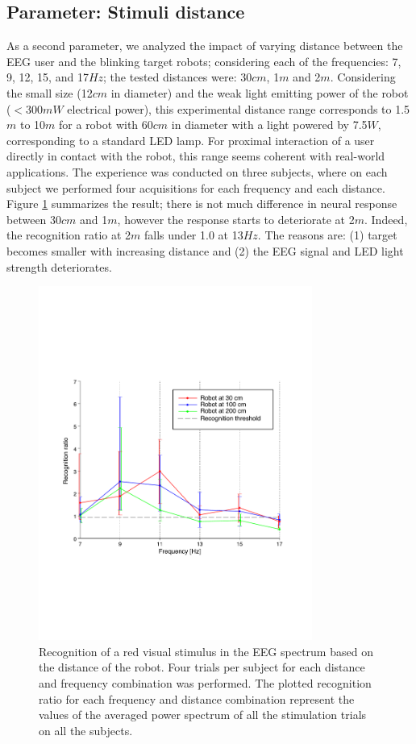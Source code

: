 \documentclass[smallextended]{svjour3}
\begin{document}
\subsection{Parameter: Stimuli distance}
As a second parameter, we analyzed the impact of varying distance between the EEG user and the blinking target robots; considering each of the frequencies: 7, 9, 12, 15, and 17$Hz$; the tested distances were: 30$cm$, 1$m$ and 2$m$. 
Considering the small size (12$cm$ in diameter) and the weak light emitting power of the robot ($< 300mW$ electrical power), this experimental distance range corresponds to 1.5$m$ to 10$m$ for a robot with 60$cm$ in diameter with a light powered by 7.5$W$, corresponding to a standard LED lamp. 
For proximal interaction of a user directly in contact with the robot, this range seems coherent with real-world applications.
The experience was conducted on three subjects, where on each subject we performed four acquisitions for each frequency and each distance. Figure \ref{fig:graph-distances} summarizes the result; there is not much difference in neural response between 30$cm$ and 1$m$, however the response starts to deteriorate at 2$m$. Indeed, the recognition ratio at 2$m$ falls under 1.0 at 13$Hz$. The reasons are: (1) target becomes smaller with increasing distance and (2) the EEG signal and LED light strength deteriorates.

\begin{figure}
\center
\includegraphics[width=0.8\textwidth]{figures/graph-distances.pdf}
\caption{Recognition of a red visual stimulus in the EEG spectrum based on the distance of the robot. Four trials per subject for each distance and frequency combination was performed. The plotted recognition ratio for each frequency and distance combination represent the values of the averaged power spectrum of all the stimulation trials on all the subjects.}
\label{fig:graph-distances}
\end{figure}
\end{document}
